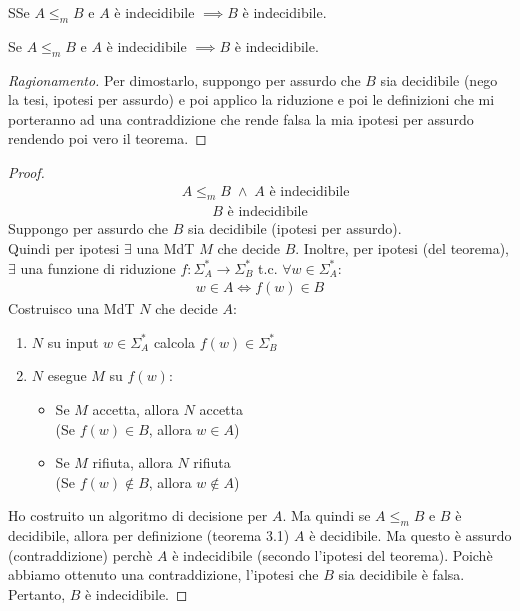 \documentclass{article}  %
\theoremstyle{definition}
\newenvironment{ragionamento}[1][]
  {\begin{proof}[Ragionamento#1]\renewcommand{\qedsymbol}{}\normalfont}
  {\end{proof}}
\begin{document}
\begin{theorem}{3.2}
  SSe $A \leq_m B$ e $A$ è indecidibile $\implies B$ è indecidibile. 
\end{theorem}
\begin{esercizio}[Dimostrazione 3.2]
    \footnotesize %
    Se $A \leq_m B$ e $A$ è indecidibile $\implies B$ è indecidibile.
    \begin{ragionamento}
      Per dimostarlo, suppongo per assurdo che $B$ sia decidibile (nego la tesi, ipotesi per assurdo) e poi applico
      la riduzione e poi le definizioni che mi porteranno ad una contraddizione che rende falsa la mia ipotesi per assurdo
      rendendo poi vero il teorema.
    \end{ragionamento}
    \begin{proof}
        \begin{align*}
        & A \leq_m B \;\wedge\; A \text{ è indecidibile} \tag*{(ipotesi)}
      \end{align*}
      \begin{align*}
        B \text{ è indecidibile} \tag*{(tesi)}
      \end{align*}
      Suppongo per assurdo che $B$ sia decidibile (ipotesi per assurdo). \\
      Quindi per ipotesi $\exists$ una MdT $M$ che decide $B$. Inoltre, per ipotesi (del teorema), $\exists$ una funzione
      di riduzione $f: \Sigma^*_A \rightarrow \Sigma^*_B$ t.c. $\forall{w} \in \Sigma^*_A$:
      \begin{align*}
        w \in A \iff f(w) \in B
      \end{align*}
      Costruisco una MdT $N$ che decide $A$:
      \begin{enumerate}
        \item $N$ su input $w \in \Sigma^*_A$ calcola $f(w) \in \Sigma^*_B$
        \item $N$ esegue $M$ su $f(w)$:
        \begin{itemize}
          \item Se $M$ accetta, allora $N$ accetta \\ 
          (Se $f(w) \in B$, allora $w \in A$)
          \item Se $M$ rifiuta, allora $N$ rifiuta \\
          (Se $f(w) \notin B$, allora $w \notin A$)
        \end{itemize}
      \end{enumerate}
      Ho costruito un algoritmo di decisione per $A$. Ma quindi se $A \leq_m B$ e $B$ è decidibile, allora per definizione
      (teorema 3.1) $A$ è decidibile. Ma questo è assurdo (contraddizione) perchè $A$ è indecidibile (secondo l'ipotesi del teorema). 
      Poichè abbiamo ottenuto una contraddizione, l'ipotesi che $B$ sia decidibile è falsa. Pertanto, $B$ è indecidibile.
    \end{proof}
\end{esercizio}
\end{document}
